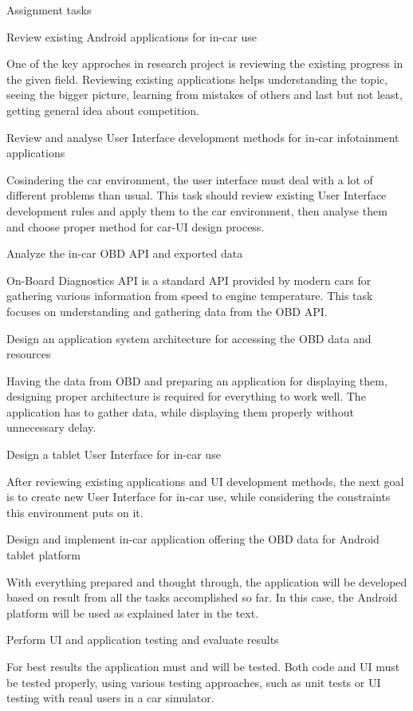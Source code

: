 \secc Assignment tasks

\seccc Review existing Android applications for in-car use

One of the key approches in research project is reviewing the existing progress in the given field. Reviewing existing applications helps understanding the topic, seeing the bigger picture, learning from mistakes of others and last but not least, getting general idea about competition.

\seccc Review and analyse User Interface development methods for in-car infotainment applications

Cosindering the car environment, the user interface must deal with a lot of different problems than usual. This task should review existing User Interface development rules and apply them to the car environment, then analyse them and choose proper method for car-UI design process.

\seccc Analyze the in-car OBD API and exported data

On-Board Diagnostics API is a standard API provided by modern cars for gathering various information from speed to engine temperature. This task focuses on understanding and gathering data from the OBD API.

\seccc Design an application system architecture for accessing the OBD data and resources

Having the data from OBD and preparing an application for displaying them, designing proper architecture is required for everything to work well. The application has to gather data, while displaying them properly without unnecessary delay.

\seccc Design a tablet User Interface for in-car use

After reviewing existing applications and UI development methods, the next goal is to create new User Interface for in-car use, while considering the constraints this environment puts on it.

\seccc Design and implement in-car application offering the OBD data for Android tablet platform

With everything prepared and thought through, the application will be developed based on result from all the tasks accomplished so far. In this case, the Android platform will be used as explained later in the text.

\seccc Perform UI and application testing and evaluate results

For best results the application must and will be tested. Both code and UI must be tested properly, using various testing approaches, such as unit tests or UI testing with reaul users in a car simulator.

